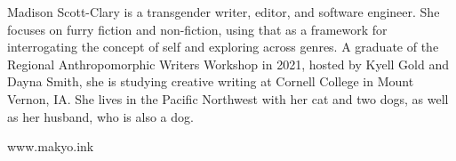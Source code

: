 \noindent Madison Scott-Clary is a transgender writer, editor, and software engineer. She focuses on furry fiction and non-fiction, using that as a framework for interrogating the concept of self and exploring across genres. A graduate of the Regional Anthropomorphic Writers Workshop in 2021, hosted by Kyell Gold and Dayna Smith, she is studying creative writing at Cornell College in Mount Vernon, IA. She lives in the Pacific Northwest with her cat and two dogs, as well as her husband, who is also a dog.

\begin{center}
    www.makyo.ink
\end{center}

\vfill
